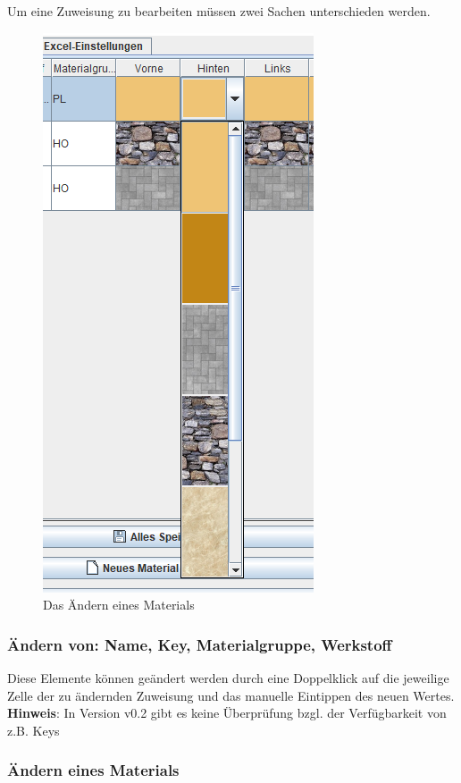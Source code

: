 \documentclass{book}
\newcommand{\hinweis}[1]{\newline \textbf{Hinweis}: #1 \newline}
\begin{document}
				Um eine Zuweisung zu bearbeiten müssen zwei Sachen unterschieden werden.
				\begin{figure}
					\includegraphics[scale=0.48]{pics/assisttool/materials-dropdown.PNG}
					\caption{Das Ändern eines Materials}
					\label{fig:materials aendern}
				\end{figure}
				\subsubsection*{Ändern von: Name, Key, Materialgruppe, Werkstoff}
					Diese Elemente können geändert werden durch eine Doppelklick auf die jeweilige Zelle der zu ändernden Zuweisung und das manuelle Eintippen des neuen Wertes.
					\hinweis{In Version v0.2 gibt es keine Überprüfung bzgl. der Verfügbarkeit von z.B. Keys}
				\subsubsection*{Ändern eines Materials}
					
\end{document}

